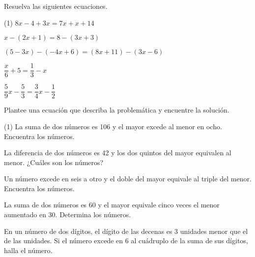 \documentclass[sin nombre]{plantilla-evaluacion-v1}
\begin{document}
\begin{partes}

\parte Resuelva las siguientes ecuaciones.

\begin{ejercicios}(1)
  \ejercicio  $8x - 4 + 3x = 7x + x + 14$
  \begin{malla}[height=3cm]
  \end{malla}
  \ejercicio  $x -(2x + 1) = 8 -(3x + 3)$
  \begin{malla}[height=3cm]
  \end{malla}
  \ejercicio  $(5-3x)-(-4x+6)=(8x+11)-(3x-6)$
  \begin{malla}[height=3cm]
  \end{malla}
  \ejercicio  $\dfrac{x}{6}+5=\dfrac{1}{3}-x$
  \begin{malla}[height=3cm]
  \end{malla}
  \ejercicio  $\dfrac{5}{9}x-\dfrac{5}{3}=\dfrac{3}{4}x-\dfrac{1}{2}$
  \begin{malla}[height=3cm]
  \end{malla}
\end{ejercicios}


\parte Plantee una ecuación que describa la problemática y encuentre la solución.

\begin{ejercicios}(1)
    \ejercicio La suma de dos números es 106 y el mayor excede al menor en ocho. 
    Encuentra los números.
    \begin{malla}[height=3cm]
    \end{malla}

    \ejercicio La diferencia de dos números es 42 y los dos quintos del mayor 
    equivalen al menor. ¿Cuáles son los números?
    \begin{malla}[height=3cm]
    \end{malla}

    \ejercicio Un número excede en seis a otro y el doble del mayor equivale 
    al triple del menor. Encuentra los números.
    \begin{malla}[height=3cm]
    \end{malla}

    \ejercicio La suma de dos números es 60 y el mayor equivale cinco veces
     el menor aumentado en 30. Determina los números.
    \begin{malla}[height=3cm]
    \end{malla}

    \ejercicio En un número de dos dígitos, el dígito de las decenas es 3 unidades 
    menor que el de las unidades. Si el número excede en 6 al cuádruplo de la suma 
    de sus dígitos, halla el número.
    \begin{malla}[height=3cm]
    \end{malla}

\end{ejercicios}

\end{partes}
\end{document}
